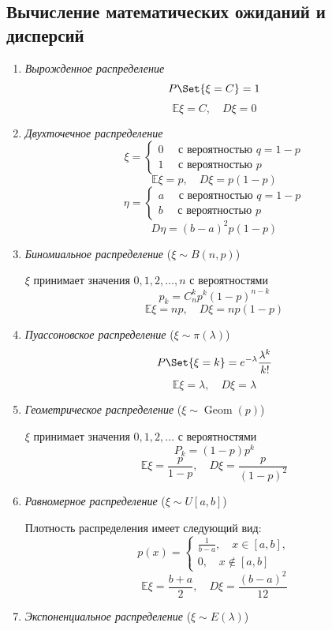 \subsection{Вычисление математических ожиданий и дисперсий}

\begin{enumerate}
	\item \emph{Вырожденное распределение}
		$$ P\Set{\xi = C} = 1 $$
		$$ \mathbb E \xi = C, \quad D\xi = 0 $$
	\item \emph{Двухточечное распределение}
		$$ \xi =
		\begin{cases}
			0 \quad \text{ с вероятностью } q = 1 - p \\
			1 \quad \text{ с вероятностью } p
		\end{cases} $$
		$$ \mathbb E \xi = p, \quad D \xi = p(1 - p) $$
		$$ \eta =
		\begin{cases}
			a \quad \text{ с вероятностью } q = 1 - p \\
			b \quad \text{ с вероятностью } p
		\end{cases} $$
		$$ D \eta = (b - a)^2p(1 - p) $$
	\item \emph{Биномиальное распределение} ($ \xi \sim B(n, p) $)

		$ \xi $ принимает значения $ 0, 1, 2, \dots, n $ с вероятностями
		$$ p_k = C_n^kp^k(1 - p)^{n - k} $$
		$$ \mathbb E \xi = np, \quad D \xi = np(1 - p) $$
	\item \emph{Пуассоновское распределение} ($ \xi \sim \pi(\lambda) $)
		$$ P\Set{\xi = k} = e^{-\lambda}\frac{\lambda^k}{k!} $$
		$$ \mathbb E \xi = \lambda, \quad D\xi = \lambda $$
	\item \emph{Геометрическое распределение} ($ \xi \sim \operatorname{Geom}(p) $)

		$ \xi $ принимает значения $ 0, 1, 2, \dotsc $ с вероятностями
		$$ P_k = (1 - p)p^k $$
		$$ \mathbb E\xi = \frac p{1 - p}, \quad D \xi = \frac p{(1 - p)^2} $$
	\item \emph{Равномерное распределение} ($ \xi \sim U[a, b] $)

		Плотность распределения имеет следующий вид:
		$$ p(x) =
		\begin{cases}
			\frac1{b - a}, \quad x \in [a, b], \\
			0, \quad x \not\in [a, b]
		\end{cases} $$
		$$ \mathbb E \xi = \frac{b + a}2, \quad D \xi = \frac{(b - a)^2}{12} $$
	\item \emph{Экспоненциальное распределение} ($ \xi \sim E(\lambda) $)


\end{enumerate}
